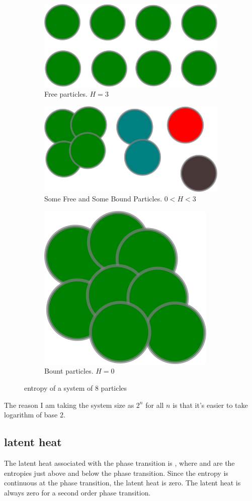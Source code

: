 	\begin{figure}
		\begin{subfigure}{.5\textwidth}
			\includegraphics[width=.5\linewidth]{entropy_cluster/step1.png}
			\caption{Free particles. $H=3$}
		\end{subfigure}
		\begin{subfigure}{.5\textwidth}
			\includegraphics[width=.5\linewidth]{entropy_cluster/step2.png}
			\caption{Some Free and Some Bound Particles. $0 < H < 3$}
		\end{subfigure}
		\begin{subfigure}{.5\textwidth}
			\includegraphics[width=.5\linewidth]{entropy_cluster/step3.png}
			\caption{Bount particles. $H=0$}
		\end{subfigure}
		\caption{entropy of a system of $8$ particles}
	\end{figure}
	
	The reason I am taking the system size as $2^n$ for all $n$ is that it's easier to take logarithm of base $2$.
	
	
	\subsection{latent heat}
	The latent heat associated with the phase transition is , where and are the entropies just above and below the phase transition. Since the entropy is continuous at the phase transition, the latent heat is zero. The latent heat is always zero for a second order phase transition.
